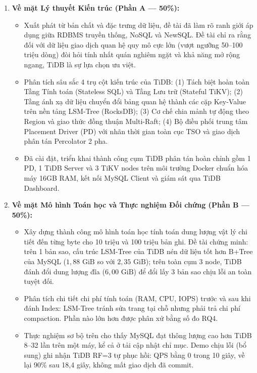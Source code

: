 \begin{enumerate}
  \item \textbf{Về mặt Lý thuyết Kiến trúc (Phần A --- 50\%):}
  \begin{itemize}
    \item Xuất phát từ bản chất và đặc trưng dữ liệu, đề tài đã làm rõ ranh giới áp dụng giữa RDBMS truyền thống, NoSQL và NewSQL. Đề tài chỉ ra rằng đối với dữ liệu giao dịch quan hệ quy mô cực lớn (vượt ngưỡng 50--100 triệu dòng) đòi hỏi tính nhất quán nghiêm ngặt và khả năng mở rộng ngang, TiDB là sự lựa chọn ưu việt.
    \item Phân tích sâu sắc 4 trụ cột kiến trúc của TiDB: (1) Tách biệt hoàn toàn Tầng Tính toán (Stateless SQL) và Tầng Lưu trữ (Stateful TiKV); (2) Tầng ánh xạ dữ liệu chuyển đổi bảng quan hệ thành các cặp Key-Value trên nền tảng LSM-Tree (RocksDB); (3) Cơ chế chia mảnh tự động theo Region và giao thức đồng thuận Multi-Raft; (4) Bộ điều phối trung tâm Placement Driver (PD) với nhãn thời gian toàn cục TSO và giao dịch phân tán Percolator 2 pha.
    \item Đã cài đặt, triển khai thành công cụm TiDB phân tán hoàn chỉnh gồm 1 PD, 1 TiDB Server và 3 TiKV nodes trên môi trường Docker chuẩn hóa máy 16GB RAM, kết nối MySQL Client và giám sát qua TiDB Dashboard.
  \end{itemize}

  \item \textbf{Về mặt Mô hình Toán học và Thực nghiệm Đối chứng (Phần B --- 50\%):}
  \begin{itemize}
    \item Xây dựng thành công mô hình toán học tính toán dung lượng vật lý chi tiết đến từng byte cho 10 triệu và 100 triệu bản ghi. Đề tài chứng minh: trên 1 bản sao, cấu trúc LSM-Tree của TiDB nén dữ liệu tốt hơn B+Tree của MySQL ($1,88\text{ GiB}$ so với $2,35\text{ GiB}$); trên toàn cụm 3 node, TiDB đánh đổi dung lượng đĩa ($6,00\text{ GiB}$) để đổi lấy 3 bản sao chịu lỗi an toàn tuyệt đối.
    \item Phân tích chi tiết chi phí tính toán (RAM, CPU, IOPS) trước và sau khi đánh Index: LSM-Tree tránh sửa trang tại chỗ nhưng phải trả chi phí compaction. Phần nào lớn hơn được phân xử bằng số đo RQ4.
    \item Thực nghiệm sơ bộ trên  cho thấy MySQL đạt thông lượng cao hơn TiDB 8--32 lần trên một máy, kể cả ở tải cập nhật chỉ mục. Demo chịu lỗi (bổ sung) ghi nhận TiDB RF=3 tự phục hồi: QPS bằng 0 trong 10 giây, về lại 90\% sau 18,4 giây, không mất giao dịch đã commit.
  \end{itemize}
\end{enumerate}

